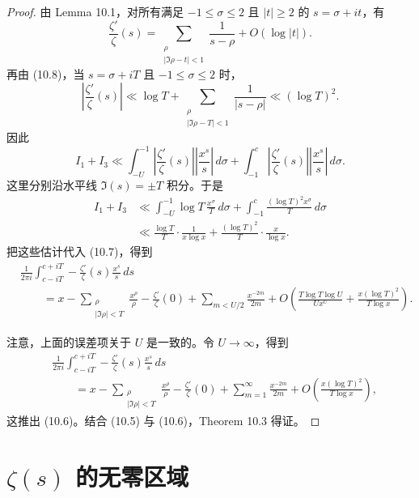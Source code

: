 \begin{proof}
	由 Lemma 10.1，对所有满足 $-1\leq\sigma\leq2$ 且 $|t|\geq2$ 的
	$s=\sigma+it$，有
	\[
		\frac{\zeta'}{\zeta}(s)
		=
		\sum_{\substack{\rho\\ |\Im\rho-t|<1}}
		\frac1{s-\rho}
		+
		O(\log |t|).
	\]
	再由 (10.8)，当 $s=\sigma+iT$ 且 $-1\leq\sigma\leq2$ 时，
	\[
		\left|\frac{\zeta'}{\zeta}(s)\right|
		\ll
		\log T
		+
		\sum_{\substack{\rho\\ |\Im\rho-T|<1}}
		\frac1{|s-\rho|}
		\ll
		(\log T)^2.
	\]
	因此
	\[
		I_1+I_3
		\ll
		\int_{-U}^{-1}
		\left|\frac{\zeta'}{\zeta}(s)\right|
		\left|\frac{x^s}{s}\right|\,d\sigma
		+
		\int_{-1}^{c}
		\left|\frac{\zeta'}{\zeta}(s)\right|
		\left|\frac{x^s}{s}\right|\,d\sigma.
	\]
	这里分别沿水平线 $\Im(s)=\pm T$ 积分。于是
	\[
	\begin{aligned}
		I_1+I_3
		&\ll
		\int_{-U}^{-1}
		\log T\,\frac{x^\sigma}{T}\,d\sigma
		+
		\int_{-1}^{c}
		\frac{(\log T)^2x^\sigma}{T}\,d\sigma \\
		&\ll
		\frac{\log T}{T}\cdot\frac{1}{x\log x}
		+
		\frac{(\log T)^2}{T}\cdot\frac{x}{\log x}.
	\end{aligned}
	\]
	把这些估计代入 (10.7)，得到
	\[
	\begin{aligned}
		&
		\frac1{2\pi i}
		\int_{c-iT}^{c+iT}
		-\frac{\zeta'}{\zeta}(s)\frac{x^s}{s}\,ds \\
		&\qquad=
		x
		-
		\sum_{\substack{\rho\\ |\Im\rho|<T}}\frac{x^\rho}{\rho}
		-
		\frac{\zeta'}{\zeta}(0)
		+
		\sum_{m<U/2}\frac{x^{-2m}}{2m}
		+
		O\left(
			\frac{T\log T\log U}{Ux^U}
			+
			\frac{x(\log T)^2}{T\log x}
		\right).
	\end{aligned}
	\]

	注意，上面的误差项关于 $U$ 是一致的。令 $U\to\infty$，得到
	\[
	\begin{aligned}
		&
		\frac1{2\pi i}
		\int_{c-iT}^{c+iT}
		-\frac{\zeta'}{\zeta}(s)\frac{x^s}{s}\,ds \\
		&\qquad=
		x
		-
		\sum_{\substack{\rho\\ |\Im\rho|<T}}\frac{x^\rho}{\rho}
		-
		\frac{\zeta'}{\zeta}(0)
		+
		\sum_{m=1}^{\infty}\frac{x^{-2m}}{2m}
		+
		O\left(
			\frac{x(\log T)^2}{T\log x}
		\right),
	\end{aligned}
	\]
	这推出 (10.6)。结合 (10.5) 与 (10.6)，Theorem 10.3 得证。
\end{proof}

\section{\texorpdfstring{\(\zeta(s)\) 的无零区域}{zeta(s) 的无零区域}}

